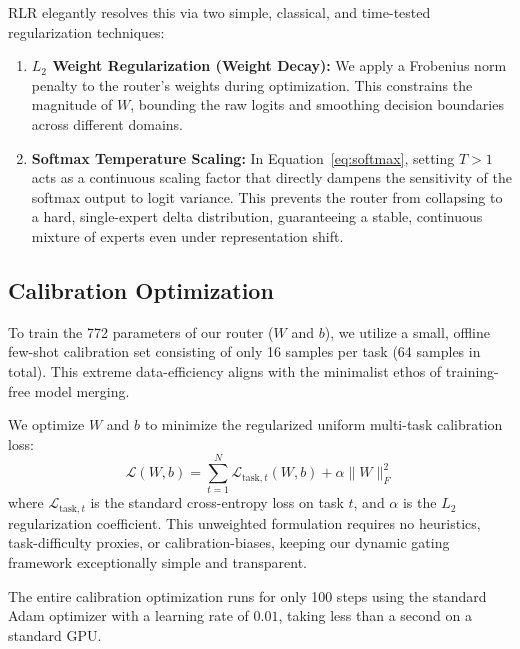 RLR elegantly resolves this via two simple, classical, and time-tested regularization techniques:
\begin{enumerate}
    \item \textbf{$L_2$ Weight Regularization (Weight Decay):} We apply a Frobenius norm penalty to the router's weights during optimization. This constrains the magnitude of $W$, bounding the raw logits and smoothing decision boundaries across different domains.
    \item \textbf{Softmax Temperature Scaling:} In Equation~\ref{eq:softmax}, setting $T > 1$ acts as a continuous scaling factor that directly dampens the sensitivity of the softmax output to logit variance. This prevents the router from collapsing to a hard, single-expert delta distribution, guaranteeing a stable, continuous mixture of experts even under representation shift.
\end{enumerate}

\subsection{Calibration Optimization}

To train the 772 parameters of our router ($W$ and $b$), we utilize a small, offline few-shot calibration set consisting of only 16 samples per task (64 samples in total). This extreme data-efficiency aligns with the minimalist ethos of training-free model merging.

We optimize $W$ and $b$ to minimize the regularized uniform multi-task calibration loss:
\begin{equation}
\label{eq:loss}
\mathcal{L}(W, b) = \sum_{t=1}^N \mathcal{L}_{\text{task}, t}(W, b) + \alpha \|W\|_F^2
\end{equation}
where $\mathcal{L}_{\text{task}, t}$ is the standard cross-entropy loss on task $t$, and $\alpha$ is the $L_2$ regularization coefficient. This unweighted formulation requires no heuristics, task-difficulty proxies, or calibration-biases, keeping our dynamic gating framework exceptionally simple and transparent.

The entire calibration optimization runs for only 100 steps using the standard Adam optimizer with a learning rate of $0.01$, taking less than a second on a standard GPU.
